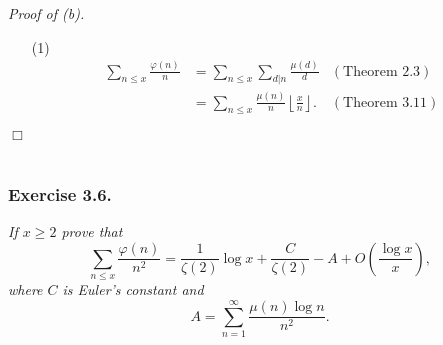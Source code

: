 \documentclass{article}
\begin{document}
\emph{Proof of (b).}
\begin{enumerate}
\item[(1)]
  \begin{align*}
    \sum_{n \leq x} \frac{\varphi(n)}{n}
    &= \sum_{n \leq x} \sum_{d|n} \frac{\mu(d)}{d}
      &(\text{Theorem 2.3}) \\
    &= \sum_{n \leq x} \frac{\mu(n)}{n} \left\lfloor\frac{x}{n}\right\rfloor.
      &(\text{Theorem 3.11})
  \end{align*}
\end{enumerate}
$\Box$ \\\\






\subsubsection*{Exercise 3.6.}
\emph{If $x \geq 2$ prove that
\[
  \sum_{n \leq x} \frac{\varphi(n)}{n^2}
  = \frac{1}{\zeta(2)} \log x + \frac{C}{\zeta(2)} - A + O\left( \frac{\log x}{x} \right),
\]
where $C$ is Euler's constant and}
\[
  A = \sum_{n=1}^{\infty} \frac{\mu(n) \log n}{n^2}.
\] \\
\end{document}
